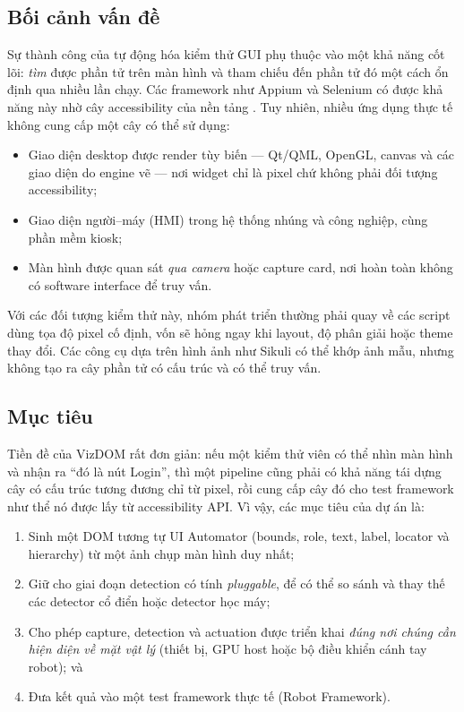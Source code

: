 \documentclass[11pt,a4paper]{article}
\begin{document}
\subsection{Bối cảnh vấn đề}
Sự thành công của tự động hóa kiểm thử GUI phụ thuộc vào một khả năng cốt lõi:
\emph{tìm} được phần tử trên màn hình và tham chiếu đến phần tử đó một cách ổn định
qua nhiều lần chạy. Các framework như Appium và Selenium có được khả năng này nhờ
cây accessibility của nền tảng \cite{uiautomator,appium}. Tuy nhiên, nhiều ứng dụng
thực tế không cung cấp một cây có thể sử dụng:
\begin{itemize}[leftmargin=1.4em]
  \item Giao diện desktop được render tùy biến --- Qt/QML, OpenGL, canvas và các
        giao diện do engine vẽ --- nơi widget chỉ là pixel chứ không phải đối tượng
        accessibility;
  \item Giao diện người--máy (HMI) trong hệ thống nhúng và công nghiệp, cùng phần
        mềm kiosk;
  \item Màn hình được quan sát \emph{qua camera} hoặc capture card, nơi hoàn toàn
        không có software interface để truy vấn.
\end{itemize}
Với các đối tượng kiểm thử này, nhóm phát triển thường phải quay về các script dùng
tọa độ pixel cố định, vốn sẽ hỏng ngay khi layout, độ phân giải hoặc theme thay đổi.
Các công cụ dựa trên hình ảnh như Sikuli \cite{yeh2009sikuli} có thể khớp ảnh mẫu,
nhưng không tạo ra cây phần tử có cấu trúc và có thể truy vấn.

\subsection{Mục tiêu}
Tiền đề của VizDOM rất đơn giản: nếu một kiểm thử viên có thể nhìn màn hình và nhận
ra ``đó là nút Login'', thì một pipeline cũng phải có khả năng tái dựng cây có cấu
trúc tương đương chỉ từ pixel, rồi cung cấp cây đó cho test framework như thể nó
được lấy từ accessibility API. Vì vậy, các mục tiêu của dự án là:
\begin{enumerate}[leftmargin=1.6em]
  \item Sinh một DOM tương tự UI Automator (bounds, role, text, label, locator và
        hierarchy) từ một ảnh chụp màn hình duy nhất;
  \item Giữ cho giai đoạn detection có tính \emph{pluggable}, để có thể so sánh và
        thay thế các detector cổ điển hoặc detector học máy;
  \item Cho phép capture, detection và actuation được triển khai \emph{đúng nơi
        chúng cần hiện diện về mặt vật lý} (thiết bị, GPU host hoặc bộ điều khiển
        cánh tay robot); và
  \item Đưa kết quả vào một test framework thực tế (Robot Framework).
\end{enumerate}
\end{document}
